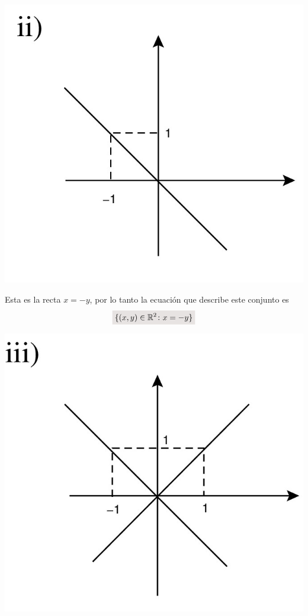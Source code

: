 \documentclass[a4paper,11pt]{article}
\newcommand{\real}{\mathbb{R}}
\newcommand{\resalta}[1]{\colorbox{g}{$\displaystyle #1$}}
\begin{document}
\begin{enumerate}
\begin{enumerate}[label = \roman*)]
            \begin{minipage}[c]{0.3\linewidth}
                \centering
                    \includegraphics[scale=0.15]{4ii-2}
            \end{minipage}
            \begin{minipage}[c]{0.7\linewidth}
                Esta es la recta $x=-y$, por lo tanto la ecuaci\'on que describe este conjunto es
                \begin{equation}
                    \notag \resalta{\{(x,y)\in \real^{2} \colon x=-y\}}
                \end{equation}
            \end{minipage}
            \begin{minipage}[c]{0.3\linewidth}
                \centering
                    \includegraphics[scale=0.15]{4ii-3}

\end{minipage}
\end{enumerate}
\end{enumerate}
\end{document}
